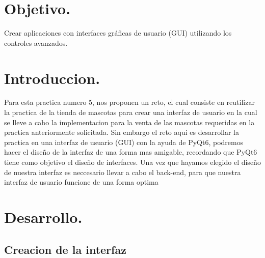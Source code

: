 \documentclass[11pt]{article}
\begin{document}
\newpage																		

\tableofcontents 

\newpage

\section{Objetivo.}
Crear aplicaciones con interfaces gráficas de usuario (GUI) utilizando los controles avanzados.

\section{Introduccion.} 
Para esta practica numero 5, nos proponen un reto, el cual consiste en reutilizar la practica de la tienda de mascotas para crear una interfaz de usuario en la cual se lleve a cabo la implementacion para la venta de las mascotas requeridas en la practica anteriormente solicitada. Sin embargo el reto aqui es desarrollar la practica en una interfaz de usuario (GUI) con la ayuda de PyQt6, podremos hacer el diseño de la interfaz de una forma mas amigable, recordando que PyQt6 tiene como objetivo el diseño de interfaces. Una vez que hayamos elegido el diseño de nuestra interfaz es neccesario llevar a cabo el back-end, para que nuestra interfaz de usuario funcione de una forma  optima
\section{Desarrollo.}

\subsection{Creacion de la interfaz}
\end{document}
